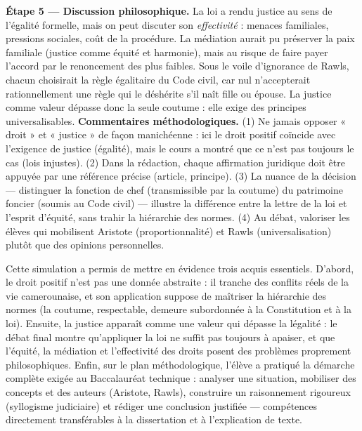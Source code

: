 \documentclass[11pt]{article}
\newcommand{\cle}[1]{{\popxbold\color{popdark}#1}}
\newcounter{popsec}
\newcounter{popsub}
\newcommand{\courssub}[1]{%
  \stepcounter{popsub}%
  \par\vspace{9pt}\noindent{\popxbold\fontsize{11.5}{13}\selectfont\color{popink}{\color{poporange}\thepopsec.\thepopsub}\hspace{6pt}#1}\par\nopagebreak\vspace{4pt}
}
\begin{document}
\begin{exoresolu}
\textbf{Étape 5 — Discussion philosophique.} La loi a rendu justice au sens de l'égalité formelle, mais on peut discuter son \emph{effectivité} : menaces familiales, pressions sociales, coût de la procédure. La médiation aurait pu préserver la paix familiale (justice comme équité et harmonie), mais au risque de faire payer l'accord par le renoncement des plus faibles. Sous le voile d'ignorance de Rawls, chacun choisirait la règle égalitaire du Code civil, car nul n'accepterait rationnellement une règle qui le déshérite s'il naît fille ou épouse. La justice comme valeur dépasse donc la seule coutume : elle exige des principes universalisables.
\tcblower
\textbf{Commentaires méthodologiques.} (1) Ne jamais opposer « droit » et « justice » de façon manichéenne : ici le droit positif coïncide avec l'exigence de justice (égalité), mais le cours a montré que ce n'est pas toujours le cas (lois injustes). (2) Dans la rédaction, chaque affirmation juridique doit être appuyée par une référence précise (article, principe). (3) La nuance de la décision — distinguer la fonction de chef (transmissible par la coutume) du patrimoine foncier (soumis au Code civil) — illustre la différence entre la lettre de la loi et l'esprit d'équité, sans trahir la hiérarchie des normes. (4) Au débat, valoriser les élèves qui mobilisent Aristote (proportionnalité) et Rawls (universalisation) plutôt que des opinions personnelles.
\end{exoresolu}

\courssub{Bilan de l'activité}

Cette simulation a permis de mettre en évidence trois acquis essentiels. D'abord, le \cle{droit positif} n'est pas une donnée abstraite : il tranche des conflits réels de la vie camerounaise, et son application suppose de maîtriser la hiérarchie des normes (la coutume, respectable, demeure subordonnée à la Constitution et à la loi). Ensuite, la \cle{justice} apparaît comme une valeur qui dépasse la légalité : le débat final montre qu'appliquer la loi ne suffit pas toujours à apaiser, et que l'équité, la médiation et l'effectivité des droits posent des problèmes proprement philosophiques. Enfin, sur le plan méthodologique, l'élève a pratiqué la démarche complète exigée au Baccalauréat technique : analyser une situation, mobiliser des concepts et des auteurs (Aristote, Rawls), construire un raisonnement rigoureux (syllogisme judiciaire) et rédiger une conclusion justifiée — compétences directement transférables à la dissertation et à l'explication de texte.
\end{document}
